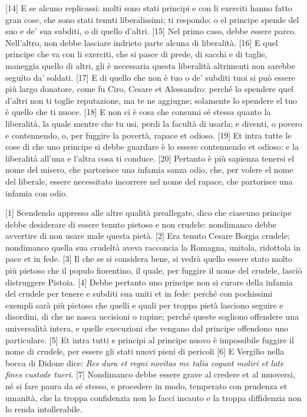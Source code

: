\quebra

{[}14{]} E se alcuno replicassi: molti sono stati principi e con li
exerciti hanno fatto gran cose, che sono stati tenuti liberalissimi; ti
respondo: o el principe spende del suo e de' sua subditi, o di quello
d'altri. {[}15{]} Nel primo caso, debbe essere parco. Nell'altro, non
debbe lasciare indrieto parte alcuna di liberalità. {[}16{]} E quel
principe che va con li exerciti, che si pasce di prede, di sacchi e di
taglie, maneggia quello di altri, gli è necessaria questa liberalità
altrimenti non sarebbe seguíto da' soldati. {[}17{]} E di quello che non
è tuo o de' subditi tuoi si può essere più largo donatore, come fu Ciro,
Cesare et Alessandro: perché lo spendere quel d'altri non ti toglie
reputazione, ma te ne aggiugne; solamente lo spendere el tuo è quello
che ti nuoce. {[}18{]} E non ci è cosa che consumi sé stessa quanto la
liberalità, la quale mentre che tu usi, perdi la facultà di usarla; e
diventi, o povero e contennendo, o, per fuggire la povertà, rapace et
odioso. {[}19{]} Et intra tutte le cose di che uno principe si debbe
guardare è lo essere contennendo et odioso: e la liberalità all'una e
l'altra cosa ti conduce. {[}20{]} Pertanto è più sapienza tenersi el
nome del misero, che partorisce una infamia sanza odio, che, per volere
el nome del liberale, essere necessitato incorrere nel nome del rapace,
che partorisce una infamia con odio.


{[}1{]} Scendendo appresso alle altre qualità preallegate, dico che
ciascuno principe debbe desiderare di essere tenuto pietoso e non
crudele: nondimanco debbe avvertire di non usare male questa pietà.
{[}2{]} Era tenuto Cesare Borgia crudele; nondimanco quella sua crudeltà
aveva racconcia la Romagna, unitola, ridottola in pace et in fede.
{[}3{]} Il che se si considera bene, si vedrà quello essere stato molto
più pietoso che il populo fiorentino, il quale, per fuggire il nome del
crudele, lasciò distruggere Pistoia. {[}4{]} Debbe pertanto uno principe
non si curare della infamia del crudele per tenere e subditi sua uniti
et in fede: perché con pochissimi exempli sarà più pietoso che quelli e
quali per troppa pietà lasciono seguire e disordini, di che ne nasca
uccisioni o rapine; perché queste sogliono offendere una universalità
intera, e quelle execuzioni che vengano dal principe offendono uno
particulare. {[}5{]} Et intra tutti e principi al principe nuovo è
impossibile fuggire il nome di crudele, per essere gli stati nuovi pieni
di pericoli {[}6{]} E Vergilio nella bocca di Didone dice: \emph{Res
dura et regni novitas me talia cogunt moliri et late fines custode
tueri.} {[}7{]} Nondimanco debbe essere grave al credere et al muoversi,
né si fare paura da sé stesso, e procedere in modo, temperato con
prudenza et umanità, che la troppa confidenzia non lo facci incauto e la
troppa diffidenzia non lo renda intollerabile.

